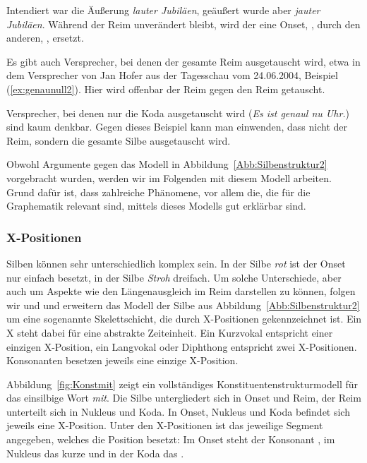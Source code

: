 Intendiert war die Äußerung \textit{lauter Jubiläen}, geäußert wurde aber \textit{jauter Jubiläen}. Während der Reim \textipa{[\t*{aU}]} unverändert bleibt, wird der eine Onset, , durch den anderen, , ersetzt.

Es gibt auch Versprecher, bei denen der gesamte Reim ausgetauscht wird, etwa in dem Versprecher von Jan Hofer aus der Tagesschau vom 24.06.2004, Beispiel (\ref{ex:genaunull2}). Hier wird offenbar der Reim \textipa{[\t*{aU}]} gegen den Reim \textipa{[Ul]} getauscht.
\ea
{}\label{ex:genaunull1} 
\label{ex:genaunull2}
\z 
\z

Versprecher, bei denen nur die Koda ausgetauscht wird (\textit{Es ist genaul nu Uhr.}) sind kaum denkbar. Gegen dieses Beispiel kann man einwenden, dass nicht der Reim, sondern die gesamte Silbe ausgetauscht wird.

Obwohl Argumente gegen das Modell in Abbildung~\ref{Abb:Silbenstruktur2} vorgebracht wurden, werden wir im Folgenden mit diesem Modell arbeiten. Grund dafür ist, dass zahlreiche Phänomene, vor allem die, die für die Graphematik relevant sind, mittels dieses Modells gut erklärbar sind.

\subsubsection{X-Positionen}
Silben können sehr unterschiedlich komplex sein. In der Silbe \textit{rot} ist der Onset nur einfach besetzt, in der Silbe \textit{Stroh} dreifach. Um solche Unterschiede, aber auch um Aspekte wie den Längenausgleich im Reim darstellen zu können, folgen wir \citet[99]{Ramers1998} und \citet[239]{Hall2000} und erweitern das Modell der Silbe aus Abbildung~\ref{Abb:Silbenstruktur2} um eine sogenannte Skelettschicht, die durch X-Positionen gekennzeichnet ist. Ein X steht dabei für eine abstrakte Zeiteinheit. Ein Kurzvokal entspricht einer einzigen X-Position, ein Langvokal oder Diphthong entspricht zwei X-Positionen. Konsonanten besetzen jeweils eine einzige X-Position.

Abbildung~\ref{fig:Konstmit} zeigt ein vollständiges Konstituentenstrukturmodell für das einsilbige Wort \textit{mit}. Die Silbe untergliedert sich in Onset und Reim, der Reim unterteilt sich in Nukleus und Koda. In Onset, Nukleus und Koda befindet sich jeweils eine X-Position. Unter den X-Positionen ist das jeweilige Segment angegeben, welches die Position besetzt: Im Onset steht der Konsonant \textipa{[m]}, im Nukleus das kurze \textipa{[I]} und in der Koda das \textipa{[t]}. 


